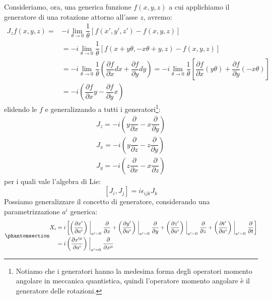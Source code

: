 Consideriamo, ora, una generica funzione $f(x,y,z)$ a cui applichiamo il generatore di una rotazione attorno all'asse $z$, avremo:
\begin{equation}
    \begin{aligned}
        J_zf(x,y,z)=&-i\lim_{\theta\xrightarrow{}0} \dfrac{1}{\theta}[f(x',y',z')-f(x,y,z)]\\
        &=-i\lim_{\theta\xrightarrow{}0} \dfrac{1}{\theta}[f(x+y\theta,-x\theta+y,z)-f(x,y,z)]\\
        &=-i\lim_{\theta\xrightarrow{}0} \dfrac{1}{\theta}\left(\dfrac{\partial f}{\partial x}dx+\dfrac{\partial f}{\partial y}dy\right)=-i\lim_{\theta\xrightarrow{}0} \dfrac{1}{\theta}\left[\dfrac{\partial f}{\partial x}(y\theta)+\dfrac{\partial f}{\partial y}(-x\theta)\right]\\
        &=-i\left(\dfrac{\partial f}{\partial x}y-\dfrac{\partial f}{\partial y}x\right)
    \end{aligned}
\end{equation}
elidendo le $f$ e generalizzando a tutti i generatori\footnote{Notiamo che i generatori hanno la medesima forma degli operatori momento angolare in meccanica quantistica, quindi l'operatore momento angolare è il generatore delle rotazioni.}:
\begin{equation}
    \begin{gathered}
        J_z=-i\left(y\dfrac{\partial }{\partial x}-x\dfrac{\partial }{\partial y}\right)\\
          J_x=-i\left(y\dfrac{\partial }{\partial z}-z\dfrac{\partial }{\partial y}\right)\\
            J_y=-i\left(z\dfrac{\partial }{\partial x}-x\dfrac{\partial }{\partial z}\right)
    \end{gathered}
\end{equation}
per i quali vale l'algebra di Lie: 
\begin{equation}
    \left[J_i,J_j\right]=i\epsilon_{ijk}J_k
\end{equation}
Possiamo generalizzare il concetto di generatore, considerando una parametrizzazione $a^i$ generica:
\begin{equation}\phantomsection\label{eq:genera_gener}
    \begin{aligned}
       X_i&=i\left[\left(\dfrac{\partial x'}{\partial a^i}\right)\biggm|_{a^i=0 }\dfrac{\partial }{\partial x}+\left(\dfrac{\partial y'}{\partial a^i}\right)\biggm|_{a^i=0 }\dfrac{\partial }{\partial y}+\left(\dfrac{\partial z'}{\partial a^i}\right)\biggm|_{a^i=0 }\dfrac{\partial }{\partial z}+\left(\dfrac{\partial t'}{\partial a^i}\right)\biggm|_{a^i=0 }\dfrac{\partial }{\partial t}\right]\\
       &=i\left(\dfrac{\partial x'^\mu}{\partial a^i}\right)\biggm|_{a^i=0 }\dfrac{\partial }{\partial x^\mu}
    \end{aligned}
\end{equation}

